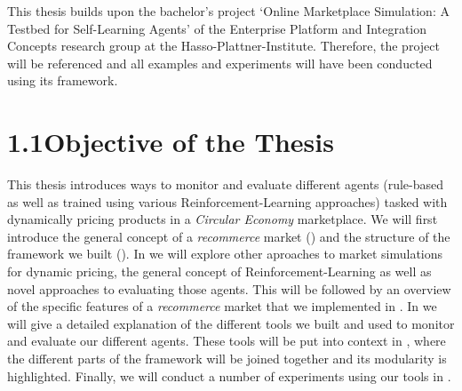 \begin{jointwork}
	This thesis builds upon the bachelor's project `Online Marketplace Simulation: A Testbed for Self-Learning Agents' of the Enterprise Platform and Integration Concepts research group at the Hasso-Plattner-Institute. Therefore, the project will be referenced and all examples and experiments will have been conducted using its framework.
\end{jointwork}

\section*{1.1\space\space Objective of the Thesis}

This thesis introduces ways to monitor and evaluate different agents (rule-based as well as trained using various Reinforcement-Learning approaches) tasked with dynamically pricing products in a \emph{Circular Economy} marketplace.
We will first introduce the general concept of a \emph{recommerce} market () and the structure of the framework we built (). In  we will explore other aproaches to market simulations for dynamic pricing, the general concept of Reinforcement-Learning as well as novel approaches to evaluating those agents. This will be followed by an overview of the specific features of a \emph{recommerce} market that we implemented in . In  we will give a detailed explanation of the different tools we built and used to monitor and evaluate our different agents. These tools will be put into context in , where the different parts of the framework will be joined together and its modularity is highlighted. Finally, we will conduct a number of experiments using our tools in .

